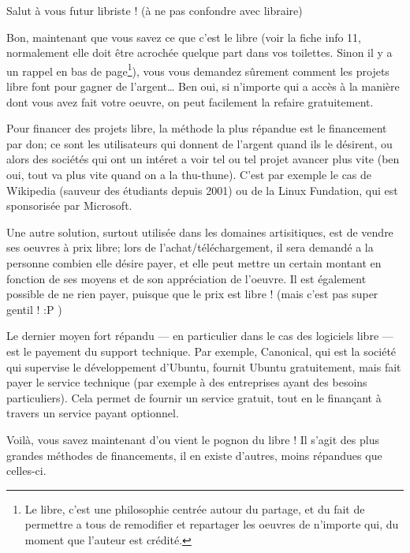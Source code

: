 \documentclass[12pt]{../fiche}
\begin{document}
Salut à vous futur libriste ! (à ne pas confondre avec libraire) 
\vspace{0.8em}

Bon, maintenant que vous savez ce que c'est le libre (voir la fiche info 11, normalement elle doit être acrochée quelque part dans vos toilettes. Sinon il y a un rappel en bas de page\footnote{Le libre, c'est une philosophie centrée autour du partage, et du fait de permettre a tous de remodifier et repartager les oeuvres de n'importe qui, du moment que l'auteur est crédité.}), vous vous demandez sûrement comment les projets libre font pour gagner de l'argent… Ben oui, si n'importe qui a accès à la manière dont vous avez fait votre oeuvre, on peut facilement la refaire gratuitement.
\vspace{0.8em}

Pour financer des projets libre, la méthode la plus répandue est le financement par don; ce sont les utilisateurs qui donnent de l'argent quand ils le désirent, ou alors des sociétés qui ont un intéret a voir tel ou tel projet avancer plus vite (ben oui, tout va plus vite quand on a la thu-thune). C'est par exemple le cas de Wikipedia (sauveur des étudiants depuis 2001) ou de la Linux Fundation, qui est sponsorisée par Microsoft.
\vspace{0.8em}

Une autre solution, surtout utilisée dans les domaines artisitiques, est de vendre ses oeuvres à prix libre; lors de l'achat/téléchargement, il sera demandé a la personne combien elle désire payer, et elle peut mettre un certain montant en fonction de ses moyens et de son appréciation de l'oeuvre. Il est également possible de ne rien payer, puisque que le prix est libre ! (mais c'est pas super gentil ! :P )
\vspace{0.8em}

Le dernier moyen fort répandu --- en particulier dans le cas des logiciels libre --- est le payement du support technique.
Par exemple, Canonical, qui est la société qui supervise le développement d'Ubuntu, fournit Ubuntu gratuitement, mais fait payer le service technique (par exemple à des entreprises ayant des besoins particuliers). Cela permet de fournir un service gratuit, tout en le finançant à travers un service payant optionnel.
\vspace{0.8em}

Voilà, vous savez maintenant d'ou vient le pognon du libre ! Il s'agit des plus grandes méthodes de financements, il en existe d'autres, moins répandues que celles-ci.
\end{document}
